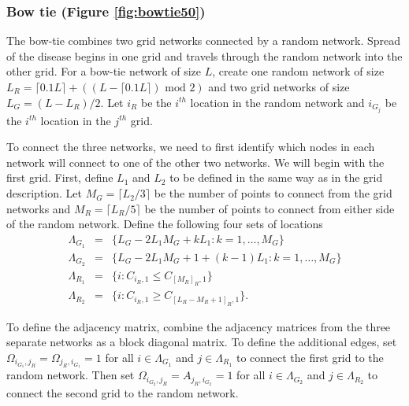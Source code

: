 \documentclass[11pt]{article}
\begin{document}
\subsubsection{Bow tie (Figure \ref{fig:bowtie50})}
\label{sec-3-1-5}

The bow-tie combines two grid networks connected by a random
network.  Spread of the disease begins in one grid and travels
through the random network into the other grid.  For a bow-tie
network of size $L$, create one random network of size $L_R =
    \lceil 0.1 L \rceil + ((L - \lceil 0.1 L \rceil) \text{ mod } 2)$
and two grid networks of size $L_G = (L - L_R)/2$.  Let $i_{R}$ be
the $i^{th}$ location in the random network and $i_{G_j}$ be the
$i^{th}$ location in the $j^{th}$ grid.

To connect the three networks, we need to first identify which
nodes in each network will connect to one of the other two
networks.  We will begin with the first grid.  First, define $L_1$
and $L_2$ to be defined in the same way as in the grid
description.  Let $M_{G} = \lceil L_2/3 \rceil$ be the number of
points to connect from the grid networks and $M_{R} = \lceil L_R/5
    \rceil$ be the number of points to connect from either side of the
random network.  Define the following four sets of locations
\begin{equation*}
  \begin{array}{rcl}
    \Lambda_{G_1} & = & \lbrace L_G -
                        2L_1M_G + kL_1 : k = 1,\ldots,M_G\rbrace\\
    \Lambda_{G_2} & = & \lbrace L_G -
                        2L_1M_G + 1 + (k-1)L_1 : k =
                        1,\ldots,M_G\rbrace\\
    \Lambda_{R_1} & = & \lbrace i : C_{i_R,1} \le C_{[M_R]_{R},1} \rbrace\\
    \Lambda_{R_2} & = & \lbrace i : C_{i_R,1} \ge C_{[L_R - M_R + 1]_{R},1} \rbrace.
  \end{array}
\end{equation*}

To define the adjacency matrix, combine the adjacency matrices from
the three separate networks as a block diagonal matrix.  To define the
additional edges, set $\Omega_{i_{G_1},j_R} = \Omega_{j_R,i_{G_1}} =
    1$ for all $i \in \Lambda_{G_1}$ and $j \in \Lambda_{R_1}$ to connect
the first grid to the random network.  Then set $\Omega_{i_{G_2},j_R}
    = A_{j_R,i_{G_2}} = 1$ for all $i \in \Lambda_{G_2}$ and $j \in
    \Lambda_{R_2}$ to connect the second grid to the random network.
\end{document}
